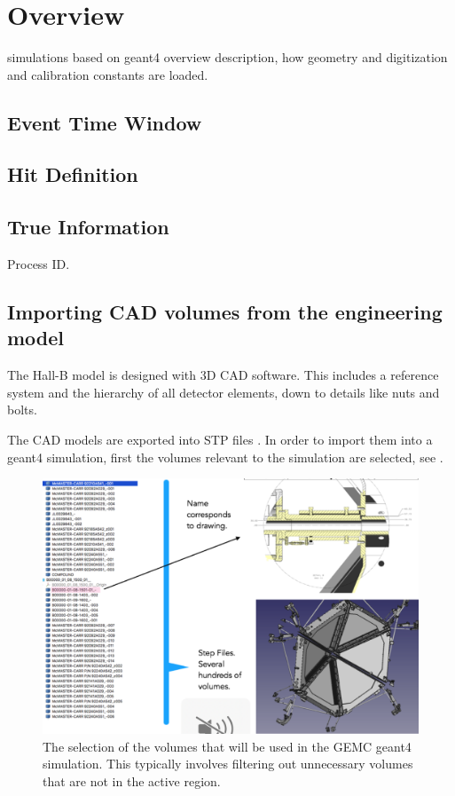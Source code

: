 \section{Overview}


simulations based on geant4 \cite{geant4} overview description, how geometry and digitization and calibration constants are loaded.

\subsection{Event Time Window}
\subsection{Hit Definition}
\subsection{True Information}
Process ID.

\subsection{Importing CAD volumes from the engineering model}


The Hall-B model is designed with 3D CAD software. This includes a reference system and the
hierarchy of all detector elements, down to details like nuts and bolts.


The CAD models are exported into STP files \cite{stepFiles}.
In order to import them into a geant4 simulation, first the volumes relevant to the simulation are selected, see .

\begin{figure}
	\centering
	\includegraphics[width=0.98\columnwidth,keepaspectratio]{img/cadSelection.png}
	\caption{The selection of the volumes that will be used in the GEMC geant4 simulation.
             This typically involves filtering out unnecessary volumes that are not in the active region.}
	\label{fig:cadSelection}
\end{figure}


